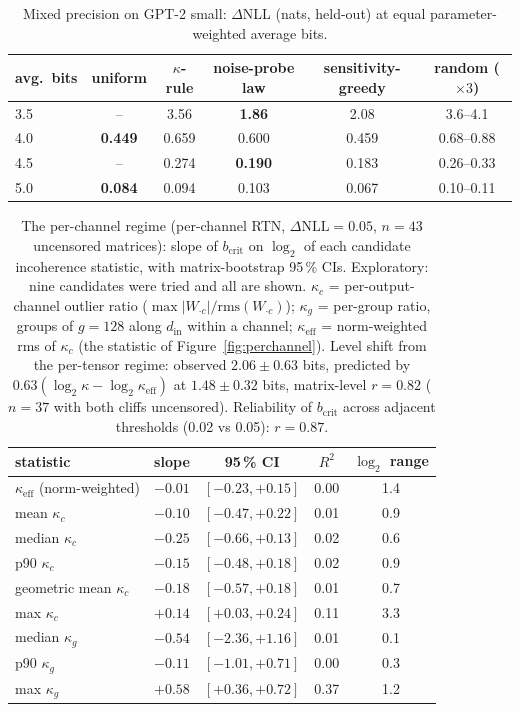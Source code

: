 \documentclass{article}
\begin{document}
\begin{table}[h]\centering\small
\caption{Mixed precision on GPT-2 small: $\Delta$NLL (nats, held-out) at equal parameter-weighted average bits.}
\label{tab:mixed}
\begin{tabular}{lccccc}\toprule
avg.\ bits & uniform & $\kappa$-rule & noise-probe law & sensitivity-greedy & random ($\times3$)\\\midrule
3.5 & -- & 3.56 & \textbf{1.86} & 2.08 & 3.6--4.1\\
4.0 & \textbf{0.449} & 0.659 & 0.600 & 0.459 & 0.68--0.88\\
4.5 & -- & 0.274 & \textbf{0.190} & 0.183 & 0.26--0.33\\
5.0 & \textbf{0.084} & 0.094 & 0.103 & 0.067 & 0.10--0.11\\\bottomrule
\end{tabular}
\end{table}
\begin{table}[h]\centering\footnotesize
\caption{The per-channel regime (per-channel RTN, $\Delta\mathrm{NLL}=0.05$, $n=43$ uncensored matrices): slope of
$b_{\mathrm{crit}}$ on $\log_2$ of each candidate incoherence statistic, with matrix-bootstrap 95\,\% CIs. Exploratory:
nine candidates were tried and all are shown. $\kappa_c$ = per-output-channel outlier ratio ($\max|W_{\cdot c}|/\mathrm{rms}(W_{\cdot c})$);
$\kappa_g$ = per-group ratio, groups of $g=128$ along $d_{\mathrm{in}}$ within a channel; $\kappa_{\mathrm{eff}}$ = norm-weighted
rms of $\kappa_c$ (the statistic of Figure~\ref{fig:perchannel}). Level shift from the per-tensor regime: observed
$2.06\pm0.63$ bits, predicted by $0.63(\log_2\kappa-\log_2\kappa_{\mathrm{eff}})$ at $1.48\pm0.32$ bits, matrix-level
$r=0.82$ ($n=37$ with both cliffs uncensored). Reliability of $b_{\mathrm{crit}}$ across adjacent thresholds
(0.02 vs 0.05): $r=0.87$.}
\label{tab:pcstats}
\begin{tabular}{lcccc}\toprule
statistic & slope & 95\,\% CI & $R^2$ & $\log_2$ range\\\midrule
$\kappa_{\mathrm{eff}}$ (norm-weighted) & $-0.01$ & $[-0.23, +0.15]$ & 0.00 & 1.4\\
mean $\kappa_c$ & $-0.10$ & $[-0.47, +0.22]$ & 0.01 & 0.9\\
median $\kappa_c$ & $-0.25$ & $[-0.66, +0.13]$ & 0.02 & 0.6\\
p90 $\kappa_c$ & $-0.15$ & $[-0.48, +0.18]$ & 0.02 & 0.9\\
geometric mean $\kappa_c$ & $-0.18$ & $[-0.57, +0.18]$ & 0.01 & 0.7\\
max $\kappa_c$ & $+0.14$ & $[+0.03, +0.24]$ & 0.11 & 3.3\\
median $\kappa_g$ & $-0.54$ & $[-2.36, +1.16]$ & 0.01 & 0.1\\
p90 $\kappa_g$ & $-0.11$ & $[-1.01, +0.71]$ & 0.00 & 0.3\\
max $\kappa_g$ & $+0.58$ & $[+0.36, +0.72]$ & 0.37 & 1.2\\\bottomrule
\end{tabular}
\end{table}
\end{document}
